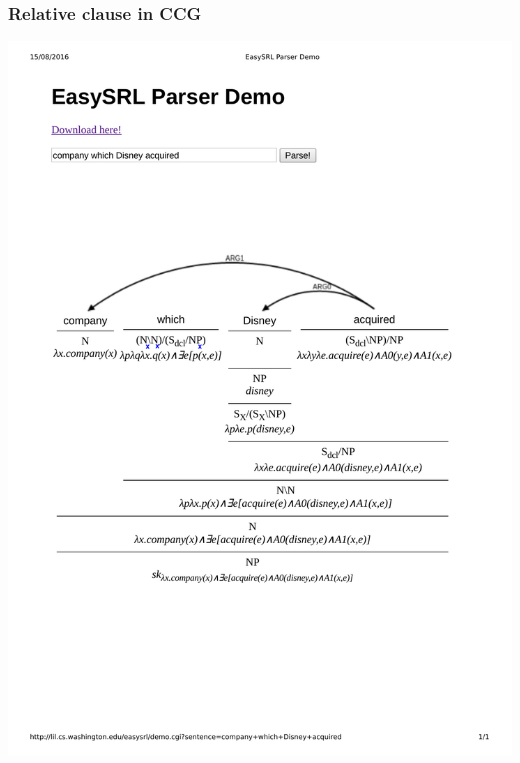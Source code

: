 \documentclass[mathserif,12pt]{beamer}
\begin{document}
\begin{frame}
\frametitle{Relative clause in CCG}
\centering
\includegraphics[scale=0.7]{figures/ccg-relative-clause}
\end{frame}
\end{document}
